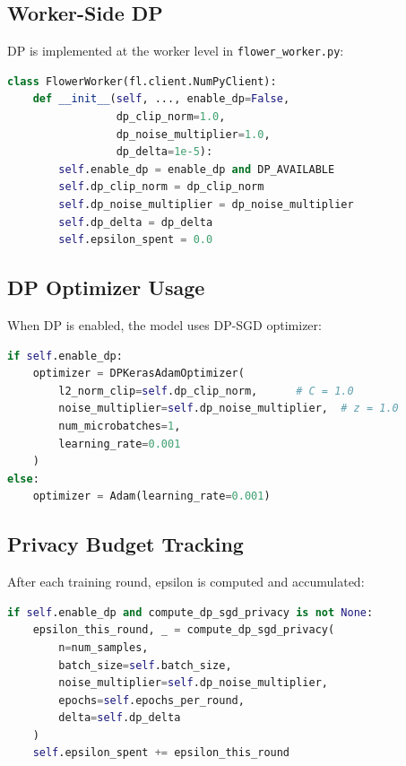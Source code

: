 \documentclass[12pt,a4paper]{article}
\begin{document}
\subsection{Worker-Side DP}

DP is implemented at the worker level in \texttt{flower\_worker.py}:

\begin{lstlisting}[language=Python, basicstyle=\small]
class FlowerWorker(fl.client.NumPyClient):
    def __init__(self, ..., enable_dp=False, 
                 dp_clip_norm=1.0, 
                 dp_noise_multiplier=1.0, 
                 dp_delta=1e-5):
        self.enable_dp = enable_dp and DP_AVAILABLE
        self.dp_clip_norm = dp_clip_norm
        self.dp_noise_multiplier = dp_noise_multiplier
        self.dp_delta = dp_delta
        self.epsilon_spent = 0.0
\end{lstlisting}

\subsection{DP Optimizer Usage}

When DP is enabled, the model uses DP-SGD optimizer:

\begin{lstlisting}[language=Python, basicstyle=\small]
if self.enable_dp:
    optimizer = DPKerasAdamOptimizer(
        l2_norm_clip=self.dp_clip_norm,      # C = 1.0
        noise_multiplier=self.dp_noise_multiplier,  # z = 1.0
        num_microbatches=1,
        learning_rate=0.001
    )
else:
    optimizer = Adam(learning_rate=0.001)
\end{lstlisting}

\subsection{Privacy Budget Tracking}

After each training round, epsilon is computed and accumulated:

\begin{lstlisting}[language=Python, basicstyle=\small]
if self.enable_dp and compute_dp_sgd_privacy is not None:
    epsilon_this_round, _ = compute_dp_sgd_privacy(
        n=num_samples,
        batch_size=self.batch_size,
        noise_multiplier=self.dp_noise_multiplier,
        epochs=self.epochs_per_round,
        delta=self.dp_delta
    )
    self.epsilon_spent += epsilon_this_round
\end{lstlisting}
\end{document}
